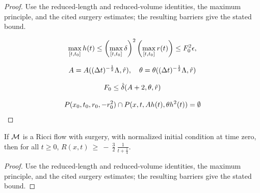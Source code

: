 \begin{proof}
\sketch Use the reduced-length and reduced-volume identities, the maximum principle, and the cited surgery estimates; the resulting barriers give the stated bound.

\begin{equation}
\label{h<<r}
\max_{[t,t_0]}h(t)\leq \left(\max_{[t,t_0]}\delta\right)^2
\left(\max_{[t,t_0]}r(t)\right)\leq F_0^2\epsilon,
\end{equation}

\begin{equation}
\label{aandthetaconditions}
A=A((\Delta t)^{-\frac12}\Lambda,\hat r),\quad
\theta=\theta((\Delta t)^{-\frac12}\Lambda,\hat r)
\end{equation}

\begin{equation}
\label{deltasmall}
 F_0\leq \hat{\delta}(A+2,\theta,\hat r)
\end{equation}

\begin{equation}
\label{p'sdisjoint}
P(x_0,t_0,r_0,-r_0^2)\cap P(x,t,Ah(t),\theta h^2(t))=\emptyset
\end{equation}
\end{proof}

\begin{lemma}
  \label{lem:kl-establishing-noncollapsing-presence-surgery-vanishing-noncollapsing}
 \label{Rev}
If ${\mathcal M}$ is a Ricci flow with surgery, with normalized initial
condition at time zero, then for all $t \ge 0$, $R(x,t) \: \ge \:
- \: \frac{3}{2} \: \frac{1}{t+\frac14}$.
\end{lemma}

\begin{proof}
\sketch Use the reduced-length and reduced-volume identities, the maximum principle, and the cited surgery estimates; the resulting barriers give the stated bound.
\end{proof}

